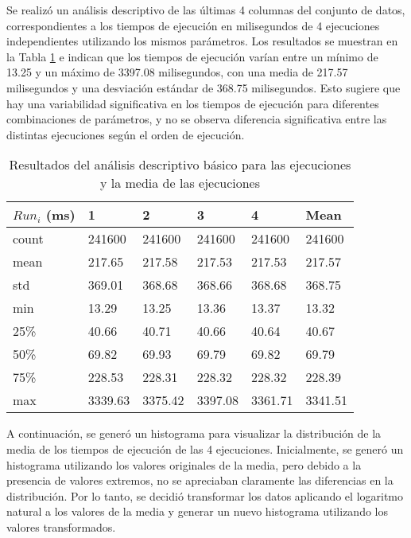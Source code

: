 Se realizó un análisis descriptivo de las últimas 4 columnas del conjunto de datos, correspondientes a los tiempos de ejecución en milisegundos de 4 ejecuciones independientes utilizando los mismos parámetros. Los resultados se muestran en la Tabla \ref{table:runsdescribe} e indican que los tiempos de ejecución varían entre un mínimo de 13.25 y un máximo de 3397.08 milisegundos, con una media de 217.57 milisegundos y una desviación estándar de 368.75 milisegundos. Esto sugiere que hay una variabilidad significativa en los tiempos de ejecución para diferentes combinaciones de parámetros, y no se observa diferencia significativa entre las distintas ejecuciones según el orden de ejecución.

\begin{table}[ht]
    \centering
    \begin{tabular}{|l|l|l|l|l||l|}
    \hline
        $Run_i$ (ms) & 1 & 2 & 3 & 4 & Mean \\ \hline
        count & 241600 & 241600 & 241600 & 241600 & 241600 \\ 
        mean & 217.65 & 217.58 & 217.53 & 217.53 & 217.57 \\ 
        std & 369.01 & 368.68 & 368.66 & 368.68 & 368.75 \\ 
        min & 13.29 & 13.25 & 13.36 & 13.37 & 13.32 \\ 
        25\% & 40.66 & 40.71 & 40.66 & 40.64 & 40.67 \\ 
        50\% & 69.82 & 69.93 & 69.79 & 69.82 & 69.79 \\ 
        75\% & 228.53 & 228.31 & 228.32 & 228.32 & 228.39 \\ 
        max & 3339.63 & 3375.42 & 3397.08 & 3361.71 & 3341.51 \\ \hline
    \end{tabular}
    \caption{\label{table:runsdescribe}Resultados del análisis descriptivo básico para las ejecuciones y la media de las ejecuciones}
\end{table}

A continuación, se generó un histograma para visualizar la distribución de la media de los tiempos de ejecución de las 4 ejecuciones. Inicialmente, se generó un histograma utilizando los valores originales de la media, pero debido a la presencia de valores extremos, no se apreciaban claramente las diferencias en la distribución. Por lo tanto, se decidió transformar los datos aplicando el logaritmo natural a los valores de la media y generar un nuevo histograma utilizando los valores transformados. 

